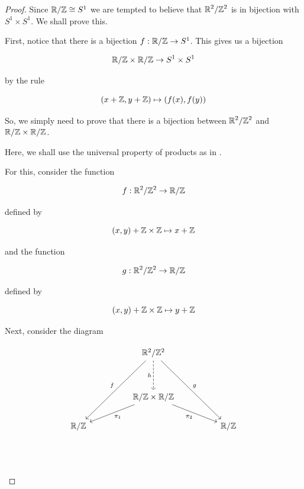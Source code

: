 \documentclass{article}
\begin{document}
\begin{proof}
  Since \({{\displaystyle \mathbb{R}}}/{{\displaystyle \mathbb{Z}}} \cong S^{1}\) we are tempted to believe that
  \({{\displaystyle \mathbb{R}^{2}}}/{{\displaystyle \mathbb{Z}^{2}}}\) is in bijection with \(S^{1}\times S^{1}\).
  We shall prove this. 

  First, notice that there is a bijection \(f: {{\displaystyle \mathbb{R}}}/{{\displaystyle \mathbb{Z}}} \to S^{1}\). 
  This gives us a bijection

  \[
    {{\displaystyle \mathbb{R}}}/{{\displaystyle \mathbb{Z}}} \times {{\displaystyle \mathbb{R}}}/{{\displaystyle \mathbb{Z}}} \to S^{1} \times S^{1}
  \]

  by the rule

  \[
    (x + \mathbb{Z}, y + \mathbb{Z}) \mapsto (f(x), f(y))
  \]

  So, we simply need to prove that there is a bijection between 
  \({{\displaystyle \mathbb{R}^{2}}}/{{\displaystyle \mathbb{Z}^{2}}}\) and \({{\displaystyle \mathbb{R}}}/{{\displaystyle \mathbb{Z}}}\times{{\displaystyle \mathbb{R}}}/{{\displaystyle \mathbb{Z}}}\).

  Here, we shall use the universal property of products as in 
  \cite[Prop-1.3.1]{kim_rough_2018}.

  For this, consider the function

  \[
    f : {{\displaystyle \mathbb{R}^{2}}}/{{\displaystyle \mathbb{Z}^{2}}} \to {{\displaystyle \mathbb{R}}}/{{\displaystyle \mathbb{Z}}}
  \]

  defined by 

  \[
    (x,y) + \mathbb{Z} \times \mathbb{Z} \mapsto x + \mathbb{Z}
  \]

  and the function 

  \[
    g: {{\displaystyle \mathbb{R}^{2}}}/{{\displaystyle \mathbb{Z}^{2}}} \to {{\displaystyle \mathbb{R}}}/{{\displaystyle \mathbb{Z}}} 
  \]

  defined by 

  \[
    (x,y) + \mathbb{Z} \times \mathbb{Z} \mapsto y + \mathbb{Z}
  \]

  Next, consider the diagram 

  \[
    \begin{tikzcd}
      && {\mathbb{R}^{2}/\mathbb{Z}^{2}} && \\
      \\
      && {\mathbb{R}/\mathbb{Z} \times \mathbb{R}/\mathbb{Z}} \\
      {\mathbb{R}/\mathbb{Z}} &&&& {\mathbb{R}/\mathbb{Z}} \\
      \\
      \arrow[dashed, "h"', from=1-3, to=3-3]
      \arrow["f"', from=1-3, to=4-1]
      \arrow["g", from=1-3, to=4-5]
      \arrow["{\pi_1}", from=3-3, to=4-1]
      \arrow["{\pi_2}"', from=3-3, to=4-5]
    \end{tikzcd}
  \]


\end{proof}
\end{document}
